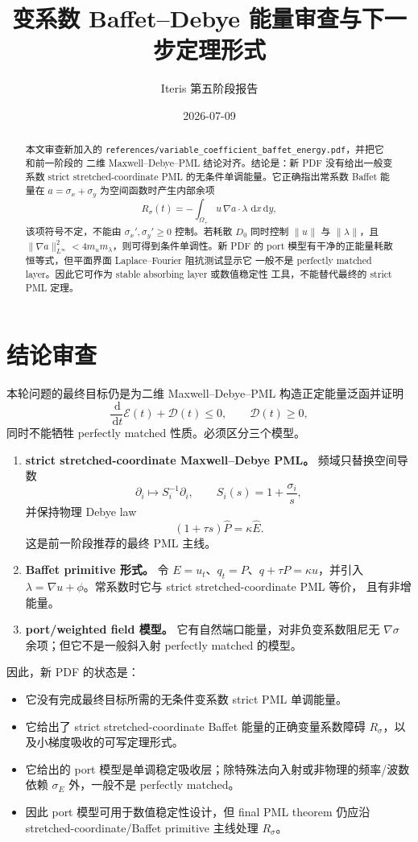 \documentclass[UTF8,a4paper,11pt]{ctexart}
\title{变系数 Baffet--Debye 能量审查与下一步定理形式}
\author{Iteris 第五阶段报告}
\date{2026-07-09}
\newcommand{\dd}{\,\mathrm d}
\newcommand{\sx}{\sigma_x}
\newcommand{\sy}{\sigma_y}
\newcommand{\Ecal}{\mathcal E}
\newcommand{\Dcal}{\mathcal D}
\begin{document}
\maketitle

\begin{abstract}
本文审查新加入的
\texttt{references/variable\_coefficient\_baffet\_energy.pdf}，并把它和前一阶段的
二维 Maxwell--Debye--PML 结论对齐。结论是：新 PDF 没有给出一般变系数
strict stretched-coordinate PML 的无条件单调能量。它正确指出常系数 Baffet 能量在
\(a=\sx+\sy\) 为空间函数时产生内部余项
\[
R_\sigma(t)=-\int_{\Omega_+}u\,\nabla a\cdot\lambda\,\dd x\dd y,
\]
该项符号不定，不能由 \(\sx',\sy'\ge0\) 控制。若耗散 \(D_0\) 同时控制
\(\|u\|\) 与 \(\|\lambda\|\)，且
\(\|\nabla a\|_{L^\infty}^2<4m_um_\lambda\)，则可得到条件单调性。新 PDF 的
port 模型有干净的正能量耗散恒等式，但平面界面 Laplace--Fourier 阻抗测试显示它
一般不是 perfectly matched layer。因此它可作为 stable absorbing layer 或数值稳定性
工具，不能替代最终的 strict PML 定理。
\end{abstract}

\tableofcontents

\section{结论审查}

本轮问题的最终目标仍是为二维 Maxwell--Debye--PML 构造正定能量泛函并证明
\[
\frac{\dd}{\dd t}\Ecal(t)+\Dcal(t)\le0,\qquad \Dcal(t)\ge0,
\]
同时不能牺牲 perfectly matched 性质。必须区分三个模型。

\begin{enumerate}
\item \textbf{strict stretched-coordinate Maxwell--Debye PML。}
频域只替换空间导数
\[
\partial_i\mapsto S_i^{-1}\partial_i,\qquad S_i(s)=1+\frac{\sigma_i}{s},
\]
并保持物理 Debye law
\[
(1+\tau s)\widehat P=\kappa\widehat E.
\]
这是前一阶段推荐的最终 PML 主线。
\item \textbf{Baffet primitive 形式。}
令 \(E=u_t\)、\(q_t=P\)、\(q+\tau P=\kappa u\)，并引入
\(\lambda=\nabla u+\phi\)。常系数时它与 strict stretched-coordinate PML 等价，
且有非增能量。
\item \textbf{port/weighted field 模型。}
它有自然端口能量，对非负变系数阻尼无 \(\nabla\sigma\) 余项；但它不是一般斜入射
perfectly matched 的模型。
\end{enumerate}

因此，新 PDF 的状态是：
\begin{itemize}
\item 它没有完成最终目标所需的无条件变系数 strict PML 单调能量。
\item 它给出了 strict stretched-coordinate Baffet 能量的正确变量系数障碍
\(R_\sigma\)，以及小梯度吸收的可写定理形式。
\item 它给出的 port 模型是单调稳定吸收层；除特殊法向入射或非物理的频率/波数依赖
\(\sigma_E\) 外，一般不是 perfectly matched。
\item 因此 port 模型可用于数值稳定性设计，但 final PML theorem 仍应沿
stretched-coordinate/Baffet primitive 主线处理 \(R_\sigma\)。
\end{itemize}
\end{document}
